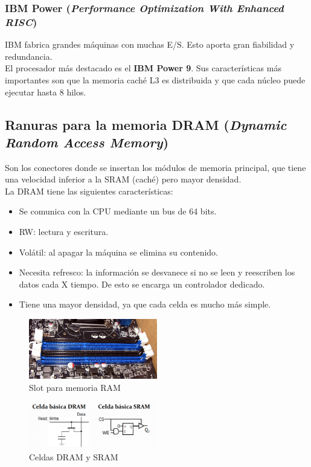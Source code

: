 \documentclass[12pt,spanish]{article}
\begin{document}
\subsubsection{IBM Power (\textit{Performance Optimization With Enhanced RISC})}

IBM fabrica grandes máquinas con muchas E/S. Esto aporta gran fiabilidad y redundancia.\\

El procesador más destacado es el \textbf{IBM Power 9}. Sus características más importantes son que la memoria caché L3 es distribuida y que cada núcleo puede ejecutar hasta 8 hilos.

\subsection{Ranuras para la memoria DRAM (\textit{Dynamic Random Access Memory})}

Son los conectores donde se insertan los módulos de memoria principal, que tiene una velocidad inferior a la SRAM (caché) pero mayor densidad.\\

La DRAM tiene las siguientes características:
\begin{itemize}
	\item Se comunica con la CPU mediante un bus de 64 bits.
	\item RW: lectura y escritura.
	\item Volátil: al apagar la máquina se elimina su contenido.
	\item Necesita refresco: la información se desvanece si no se leen y reescriben los datos cada X tiempo. De esto se encarga un controlador dedicado.
	\item Tiene una mayor densidad, ya que cada celda es mucho más simple.
\end{itemize}
\begin{figure}[H]
	\centering
	\includegraphics[width=0.5\textwidth]{ramslot.jpg}
	\caption{Slot para memoria RAM}
\end{figure}
\begin{figure}[H]
	\centering
	\includegraphics[width=0.5\textwidth]{ramcells.png}
	\caption{Celdas DRAM y SRAM}
\end{figure}
\end{document}
